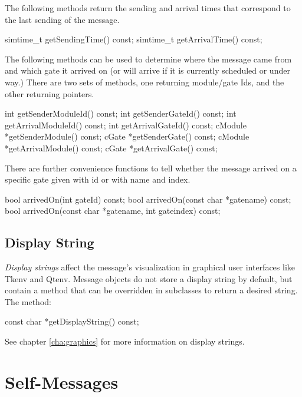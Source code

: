 The following methods return the sending and arrival times that correspond
to the last sending of the message.

\begin{cpp}
simtime_t getSendingTime() const;
simtime_t getArrivalTime() const;
\end{cpp}

The following methods can be used to determine where the message came from
and which gate it arrived on (or will arrive if it is currently scheduled
or under way.) There are two sets of methods, one returning module/gate Ids,
and the other returning pointers.

\begin{cpp}
int getSenderModuleId() const;
int getSenderGateId() const;
int getArrivalModuleId() const;
int getArrivalGateId() const;
cModule *getSenderModule() const;
cGate *getSenderGate() const;
cModule *getArrivalModule() const;
cGate *getArrivalGate() const;
\end{cpp}

There are further convenience functions to tell whether
the message arrived on a specific gate given with id or
with name and index.

\begin{cpp}
bool arrivedOn(int gateId) const;
bool arrivedOn(const char *gatename) const;
bool arrivedOn(const char *gatename, int gateindex) const;
\end{cpp}


\subsection{Display String}
\label{sec:messages:displaystring}

\textit{Display strings} affect the message's visualization in graphical
user interfaces like Tkenv and Qtenv. Message objects do not store a
display string by default, but contain a  method
that can be overridden in subclasses to return a desired string.  The
method:

\begin{cpp}
const char *getDisplayString() const;
\end{cpp}

See chapter \ref{cha:graphics} for more information on display strings.



\section{Self-Messages}
\label{sec:msgs:self-messages}

